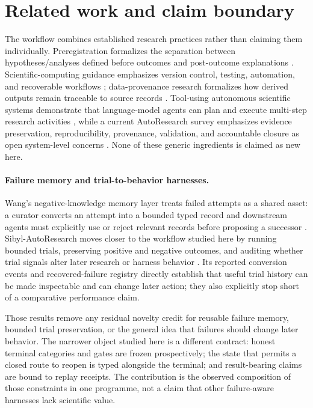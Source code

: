 \section{Related work and claim boundary}

The workflow combines established research practices rather than claiming them individually. Preregistration formalizes the separation between hypotheses/analyses defined before outcomes and post-outcome explanations \cite{nosek2018preregistration}. Scientific-computing guidance emphasizes version control, testing, automation, and recoverable workflows \cite{wilson2014best}; data-provenance research formalizes how derived outputs remain traceable to source records \cite{buneman2001provenance}. Tool-using autonomous scientific systems demonstrate that language-model agents can plan and execute multi-step research activities \cite{boiko2023autonomous}, while a current AutoResearch survey emphasizes evidence preservation, reproducibility, provenance, validation, and accountable closure as open system-level concerns \cite{tie2026autoresearchsurvey}. None of these generic ingredients is claimed as new here.

\paragraph{Failure memory and trial-to-behavior harnesses.}
Wang's negative-knowledge memory layer treats failed attempts as a shared asset: a curator converts an attempt into a bounded typed record and downstream agents must explicitly use or reject relevant records before proposing a successor \cite{wang2026negativeknowledge}. Sibyl-AutoResearch moves closer to the workflow studied here by running bounded trials, preserving positive and negative outcomes, and auditing whether trial signals alter later research or harness behavior \cite{wang2026sibyl}. Its reported conversion events and recovered-failure registry directly establish that useful trial history can be made inspectable and can change later action; they also explicitly stop short of a comparative performance claim.

Those results remove any residual novelty credit for reusable failure memory, bounded trial preservation, or the general idea that failures should change later behavior. The narrower object studied here is a different contract: honest terminal categories and gates are frozen prospectively; the state that permits a closed route to reopen is typed alongside the terminal; and result-bearing claims are bound to replay receipts. The contribution is the observed composition of those constraints in one programme, not a claim that other failure-aware harnesses lack scientific value.

